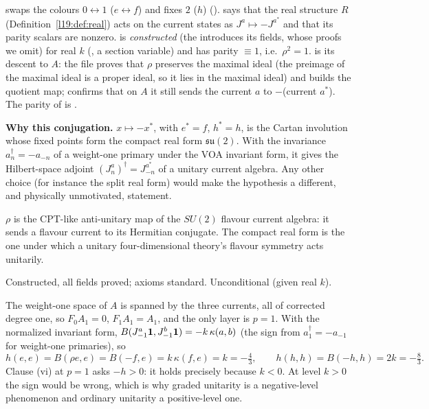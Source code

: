 \begin{dictionary}
 swaps the colours $0\leftrightarrow1$ ($e\leftrightarrow f$) and fixes $2$ ($h$)
().  says that the real structure $R$ (Definition~\ref{l19:def:real})
acts on the current states as $J^a\mapsto-J^{a^*}$ and that its parity scalars are nonzero.  is
\emph{constructed} (the  introduces its fields, whose proofs we omit) for real $k$ (,
a section variable) and has parity $\equiv1$, i.e.\ $\rho^2=1$.  is its descent to $A$: the file proves
that $\rho$ preserves the maximal ideal (the preimage of the maximal ideal is a proper ideal, so it lies in the maximal ideal) and
builds the quotient map;  confirms that on $A$ it still sends the current $a$ to $-$(current $a^*$).
The parity of  is .

\textbf{Why this conjugation.} $x\mapsto-x^{*}$, with $e^*=f$, $h^*=h$, is the Cartan involution whose fixed points form the compact
real form $\mathfrak{su}(2)$. With the invariance $a_n^\dagger=-a_{-n}$ of a weight-one primary under the VOA invariant form, it
gives the Hilbert-space adjoint $(J^a_n)^\dagger=J^{a^*}_{-n}$ of a unitary current algebra. Any other choice (for instance the split
real form) would make the hypothesis a different, and physically unmotivated, statement.
\end{dictionary}

\begin{physics}
$\rho$ is the CPT-like anti-unitary map of the $SU(2)$ flavour current algebra: it sends a flavour current to its Hermitian
conjugate. The compact real form is the one under which a unitary four-dimensional theory's flavour symmetry acts unitarily.
\end{physics}

\begin{status}
Constructed, all fields proved; axioms standard. Unconditional (given real $k$).
\end{status}

\begin{example}\label{l28:ex:weightone}
The weight-one space of $A$ is spanned by the three currents, all of corrected degree one, so $F_0A_1=0$, $F_1A_1=A_1$, and the
only layer is $p=1$. With the normalized invariant form, $B(J^a_{-1}\mathbf 1,J^b_{-1}\mathbf 1)=-k\,\kappa(a,b)$ (the sign
from $a_1^\dagger=-a_{-1}$ for weight-one primaries), so
\begin{equation*}
h(e,e)=B(\rho e,e)=B(-f,e)=k\,\kappa(f,e)=k=-\tfrac43,\qquad h(h,h)=B(-h,h)=2k=-\tfrac83 .
\end{equation*}
Clause (vi) at $p=1$ asks $-h>0$: it holds precisely because $k<0$.
At level $k>0$ the sign would be wrong, which is
why graded unitarity is a negative-level phenomenon and ordinary unitarity a positive-level one.
\end{example}

